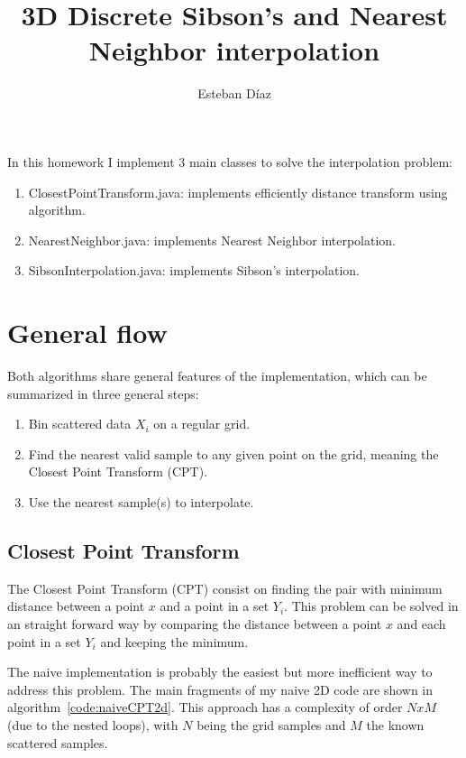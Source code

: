 \documentclass[10pt]{article}
\author{Esteban D\'{i}az}
\title{3D Discrete Sibson's and Nearest Neighbor interpolation}{}
\begin{document}
\maketitle
In this homework I implement 3 main classes to solve the interpolation 
problem:
\begin{enumerate}
  \item ClosestPointTransform.java: implements efficiently distance
   transform using ~\cite{Pedro_dt} algorithm.
  \item NearestNeighbor.java: implements Nearest Neighbor interpolation.
  \item SibsonInterpolation.java: implements Sibson's interpolation.
\end{enumerate}



\section{General flow}
  Both algorithms share general features of the implementation, which can
  be summarized in three general steps:
 \begin{enumerate}
  \item Bin scattered data $X_i$ on a regular grid.
  \item Find the nearest valid sample to any given point on the
         grid, meaning the Closest Point Transform (CPT).
  \item Use the nearest sample(s) to interpolate.
 \end{enumerate}

\subsection{Closest Point Transform}
  The Closest Point Transform (CPT) consist on finding the pair with minimum distance
 between a point $x$ and a point in a set $Y_i$. This problem can be solved in an
straight forward way by comparing the distance between a point $x$ and each point 
in a set $Y_i$ and keeping the minimum.

 The naive implementation is probably the easiest but more inefficient way to 
address this problem. The main fragments of my naive 2D code are shown in 
algorithm~\ref{code:naiveCPT2d}. This approach has a complexity of 
order $NxM$ (due to the nested loops), with $N$ being the grid samples and $M$ 
the known scattered samples. 
  
\end{document}
